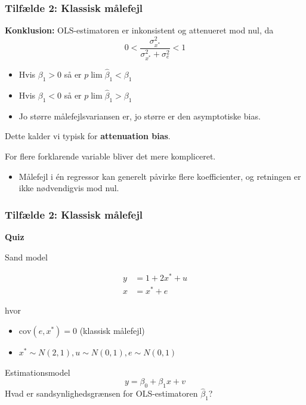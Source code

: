 \documentclass[aspectratio=43,t]{beamer}
\begin{document}

\begin{frame}
\frametitle{Tilfælde 2: Klassisk målefejl}

\textbf{Konklusion:} OLS-estimatoren er inkonsistent og attenueret mod nul, da
	\begin{equation*}
	0<\frac{\sigma _{x^{*}}^{2}}{\sigma_{x^{*}}^{2}+\sigma_{e}^{2}}<1
	\end{equation*}
\vspace{-0.5cm}
\begin{itemize}
\item Hvis $\beta_{1}>0$ så er $p\lim \hat{\beta}_{1}<\beta_{1}$

\item Hvis $\beta_{1}<0$ så er $p\lim \hat{\beta}_{1}>\beta _{1}$

\item Jo større målefejlsvariansen er, jo større er den asymptotiske bias. %
\end{itemize}
Dette kalder vi typisk for \textbf{attenuation bias}.

For flere forklarende variable bliver det mere kompliceret.
\begin{itemize}
\item Målefejl i én regressor kan generelt påvirke flere koefficienter, og retningen er ikke nødvendigvis mod nul.
\end{itemize}

\end{frame}


\begin{frame}
\frametitle{Tilfælde 2: Klassisk målefejl}

	\textbf{Quiz} 

	Sand model
		
    \vspace{-1cm}
	\begin{align*}
	y	&=	1+2x^{*}+u \\	
	x  &= x^{*}+e
	\end{align*}	
	\vspace{-1cm}
	
	hvor 
	\begin{itemize}
	\item $\text{cov}(e,x^{*})=0$ (klassisk målefejl)
	\item $x^{*}\sim N(2,1),u\sim N(0,1),e\sim N(0,1)$
	\end{itemize}
	Estimationsmodel
	\begin{equation*}
	y = \beta_{0}+\beta_{1}x + v
	\end{equation*}	
	Hvad er sandsynlighedsgrænsen for OLS-estimatoren $\hat{\beta}_{1}$?

\end{frame}
\end{document}
